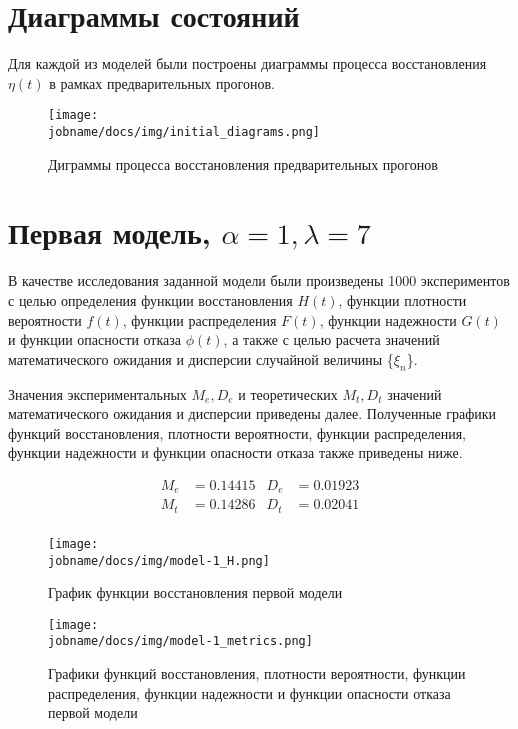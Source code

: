 \newpage

\section*{Диаграммы состояний}

Для каждой из моделей были построены диаграммы процесса восстановления $\eta(t)$ в рамках предварительных прогонов.

\begin{figure}[h!]
    \centering
    \texttt{[image: \\jobname/docs/img/initial\_diagrams.png]}
    \caption{Диграммы процесса восстановления предварительных прогонов}
\end{figure}

\clearpage

\section*{Первая модель, $\alpha = 1, \lambda = 7$}

В качестве исследования заданной модели были произведены 1000 экспериментов с целью определения функции восстановления
$H(t)$, функции плотности вероятности $f(t)$, функции распределения $F(t)$, функции надежности $G(t)$ и функции
опасности отказа $\phi(t)$, а также с целью расчета значений математического ожидания и дисперсии
случайной величины \{$\xi_n$\}.

Значения экспериментальных  $M_e, D_e$ и теоретических $M_t, D_t$ значений математического ожидания и дисперсии
приведены далее.
Полученные графики функций восстановления, плотности вероятности, функции распределения, функции надежности и функции
опасности отказа также приведены ниже.

\begin{align*}
     M_e & = 0.14415 & D_e & = 0.01923 \\
     M_t & = 0.14286 & D_t & = 0.02041 \\
\end{align*}

\begin{figure}[h!]
    \centering
    \texttt{[image: \\jobname/docs/img/model-1\_H.png]}
    \caption{График функции восстановления первой модели}
\end{figure}

\begin{figure}[h!]
    \centering
    \texttt{[image: \\jobname/docs/img/model-1\_metrics.png]}
    \caption{Графики функций восстановления, плотности вероятности, функции распределения, функции надежности и функции
    опасности отказа первой модели}
\end{figure}

